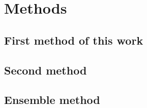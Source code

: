 \chapter[METHODS]{Methods} \label{chap:method}
\pagestyle{myheadings}

\section{First method of this work}\label{sec:method_A}

\kant[22-28]  %

\section{Second method}\label{sec:method_B}

\kant[29-31]  %
    
\section{Ensemble method}\label{sec:method_C}

\kant[32-27]  %


%
